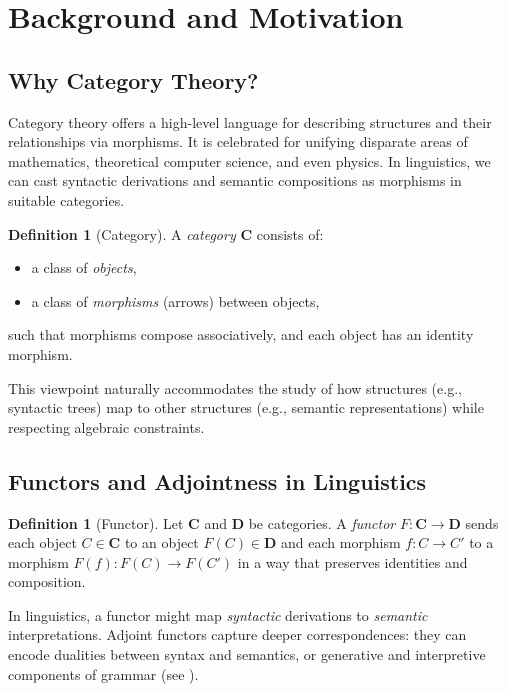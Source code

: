 \documentclass[12pt]{article}
\theoremstyle{plain}
\theoremstyle{definition}
\newtheorem{definition}[theorem]{Definition}
\begin{document}
\section{Background and Motivation}

\subsection{Why Category Theory?}
Category theory offers a high-level language for describing structures and their relationships via morphisms. It is celebrated for unifying disparate areas of mathematics, theoretical computer science, and even physics. In linguistics, we can cast syntactic derivations and semantic compositions as morphisms in suitable categories.

\begin{definition}[Category]
A \emph{category} \(\mathbf{C}\) consists of:
\begin{itemize}
    \item a class of \emph{objects},
    \item a class of \emph{morphisms} (arrows) between objects,
\end{itemize}
such that morphisms compose associatively, and each object has an identity morphism.
\end{definition}

This viewpoint naturally accommodates the study of how structures (e.g., syntactic trees) map to other structures (e.g., semantic representations) while respecting algebraic constraints.

\subsection{Functors and Adjointness in Linguistics}
\begin{definition}[Functor]
Let \(\mathbf{C}\) and \(\mathbf{D}\) be categories. A \emph{functor} \(F: \mathbf{C} \to \mathbf{D}\) sends each object \(C \in \mathbf{C}\) to an object \(F(C) \in \mathbf{D}\) and each morphism \(f: C \to C'\) to a morphism \(F(f): F(C) \to F(C')\) in a way that preserves identities and composition.
\end{definition}

In linguistics, a functor might map \emph{syntactic} derivations to \emph{semantic} interpretations. Adjoint functors capture deeper correspondences: they can encode dualities between syntax and semantics, or generative and interpretive components of grammar (see \cite{BarkerShan}).
\end{document}
